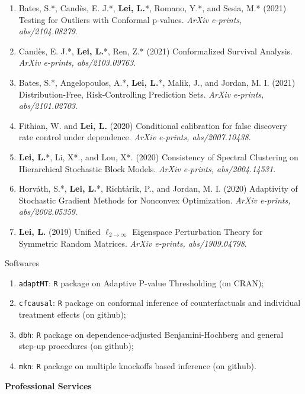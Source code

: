 \documentclass{article}
\begin{document}
\begin{enumerate}
\item Bates, S.*, Cand\`{e}s, E. J.*, \textbf{Lei, L.}*, Romano, Y.*, and Sesia, M.* (2021) Testing for Outliers with Conformal p-values. \emph{ArXiv e-prints, abs/2104.08279}.
\item Cand\`{e}s, E. J.*, \textbf{Lei, L.}*, Ren, Z.* (2021) Conformalized Survival Analysis. \emph{ArXiv e-prints, abs/2103.09763}.
\item Bates, S.*, Angelopoulos, A.*, \textbf{Lei, L.}*, Malik, J., and Jordan, M. I. (2021) Distribution-Free, Risk-Controlling Prediction Sets. \emph{ArXiv e-prints, abs/2101.02703}.
\item Fithian, W. and \textbf{Lei, L.} (2020) Conditional calibration for false discovery rate control under dependence. \emph{ArXiv e-prints, abs/2007.10438}.
\item \textbf{Lei, L.}*, Li, X*., and Lou, X*. (2020) Consistency of Spectral Clustering on Hierarchical Stochastic Block Models. \emph{ArXiv e-prints, abs/2004.14531}.
\item Horv\'{a}th, S.*, \textbf{Lei, L.}*, Richt\'{a}rik, P., and Jordan, M. I. (2020) Adaptivity of Stochastic Gradient Methods for Nonconvex Optimization. \emph{ArXiv e-prints, abs/2002.05359}.
\item \textbf{Lei, L.} (2019) Unified $\ell_{2\rightarrow\infty}$ Eigenspace Perturbation Theory for Symmetric Random Matrices. \emph{ArXiv e-prints, abs/1909.04798}.
\end{enumerate}

\begin{large}
\noindent Softwares 
\end{large}

\begin{enumerate}
\item \texttt{adaptMT}: \texttt{R} package on Adaptive P-value Thresholding (on CRAN);
\item \texttt{cfcausal}: \texttt{R} package on conformal inference of counterfactuals and individual treatment effects (on github);
\item \texttt{dbh}: \texttt{R} package on dependence-adjusted Benjamini-Hochberg and general step-up procedures (on github);
\item \texttt{mkn}: \texttt{R} package on multiple knockoffs based inference (on github).
\end{enumerate}

\vspace{2mm}
\begin{large}
\noindent \textbf{Professional Services}
\end{large}
\vspace{5mm}
\end{document}

